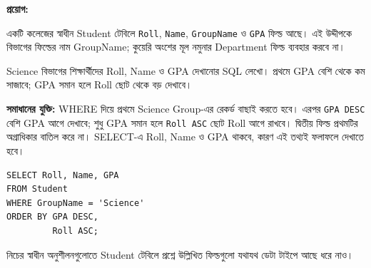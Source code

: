 \textbf{প্রয়োগ:}

একটি কলেজের স্বাধীন Student টেবিলে \texttt{Roll}, \texttt{Name}, \texttt{GroupName} ও \texttt{GPA} ফিল্ড আছে। এই উদ্দীপকে বিভাগের ফিল্ডের নাম GroupName; কুয়েরি অংশের মূল নমুনার Department ফিল্ড ব্যবহার করবে না।

Science বিভাগের শিক্ষার্থীদের Roll, Name ও GPA দেখানোর SQL লেখো। প্রথমে GPA বেশি থেকে কম সাজাবে; GPA সমান হলে Roll ছোট থেকে বড় দেখাবে।

\begin{chSixSideBySide}[.48]
\textbf{সমাধানের যুক্তি:} WHERE দিয়ে প্রথমে Science Group-এর রেকর্ড বাছাই করতে হবে। এরপর \texttt{GPA DESC} বেশি GPA আগে দেখাবে; শুধু GPA সমান হলে \texttt{Roll ASC} ছোট Roll আগে রাখবে। দ্বিতীয় ফিল্ড প্রথমটির অগ্রাধিকার বাতিল করে না। SELECT-এ Roll, Name ও GPA থাকবে, কারণ এই তথ্যই ফলাফলে দেখাতে হবে।
\chSixNextColumn
\begin{verbatim}
SELECT Roll, Name, GPA
FROM Student
WHERE GroupName = 'Science'
ORDER BY GPA DESC,
         Roll ASC;
\end{verbatim}
\end{chSixSideBySide}

নিচের স্বাধীন অনুশীলনগুলোতে Student টেবিলে প্রশ্নে উল্লিখিত ফিল্ডগুলো যথাযথ ডেটা টাইপে আছে ধরে নাও।

